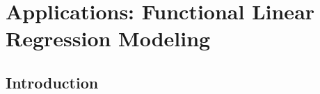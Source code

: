 
\chapter{Applications: Functional Linear Regression Modeling} %

\label{Chapter5} %



\section{Introduction}


